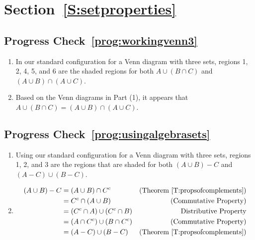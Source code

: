 \section*{Section~\ref{S:setproperties}}
\subsection*{Progress Check~\ref{prog:workingvenn3}}
\begin{enumerate}
\item In our standard configuration for a Venn diagram with three sets, regions 1, 2, 4, 5, and 6 are the shaded regions for both $A \cup \left( {B \cap C} \right)$ and  
$\left( {A \cup B} \right) \cap \left( {A \cup C} \right)$.


\item Based on the Venn diagrams in Part (1), it appears that 
$A \cup \left( {B \cap C} \right) = \left( {A \cup B} \right) \cap \left( {A \cup C} \right)$.
\end{enumerate}



\subsection*{Progress Check~\ref{prog:usingalgebrasets}}
\begin{enumerate}
  \item Using our standard configuration for a Venn diagram with three sets, regions 1, 2, and 3 are the regions that are shaded for both 
$\left( {A \cup B} \right) - C$  and   $\left( {A - C} \right) \cup \left( {B - C} \right)$.
  \item \begin{align*}
\left( {A \cup B} \right) - C &= \left( {A \cup B} \right) \cap C^c &\text{(Theorem \ref{T:propsofcomplements})} \\
                              &= C^c  \cap \left( {A \cup B} \right) &\text{(Commutative Property)} \\
                              &= \left( C^c \cap A \right) \cup \left( C^c \cap B \right) &\text{Distributive Property} \\
                              &= \left( A \cap C^c \right) \cup \left( B \cap C^c \right) &\text{(Commutative Property)}\\
                              &= \left( A - C \right) \cup \left( B - C \right) &\text{(Theorem \ref{T:propsofcomplements})}
\end{align*}

\end{enumerate}

\hbreak

\endinput
